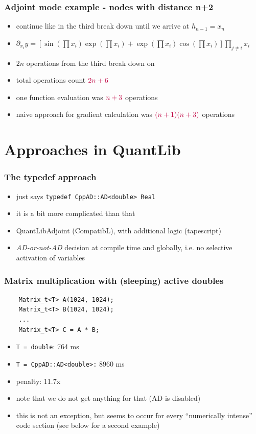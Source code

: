 \documentclass[10pt,German]{beamer}
\begin{document}
\begin{frame}[fragile]
\frametitle{Adjoint mode example - nodes with distance n+2}
\begin{itemize}
\item continue like in the third break down until we arrive at $h_{n-1} = x_n$
\item $\partial_{x_i} y = \left[\sin(\prod x_i)\exp(\prod x_i)+\exp(\prod x_i)\cos(\prod x_i)\right] \prod_{j\neq i} x_i$
\item $2n$ operations from the third break down on
\item total operations count $\textcolor{purple}{2n+6}$
\item one function evaluation was $\textcolor{purple}{n+3}$ operations
\item naive approach for gradient calculation was $\textcolor{purple}{(n+1)(n+3)}$ operations
\end{itemize}
\end{frame}

\section{Approaches in QuantLib}

\begin{frame}[fragile]
\frametitle{The typedef approach}
\begin{itemize}
\item just says \verb+typedef CppAD::AD<double> Real+
\item it is a bit more complicated than that
\item QuantLibAdjoint (CompatibL), with additional logic (tapescript)
\item \textit{AD-or-not-AD} decision at compile time and globally, i.e. no selective activation of variables
\end{itemize}
\end{frame}

\begin{frame}[fragile]
\frametitle{Matrix multiplication with (sleeping) active doubles}
\begin{verbatim}
    Matrix_t<T> A(1024, 1024);
    Matrix_t<T> B(1024, 1024);
    ...
    Matrix_t<T> C = A * B;
\end{verbatim}
\begin{itemize}
\item \verb+T = double+: 764 ms
\item \verb+T = CppAD::AD<double>:+ 8960 ms
\item penalty: 11.7x
\item note that we do not get anything for that (AD is disabled)
\item this is not an exception, but seems to occur for every ``numerically intense'' code section (see below for a second example)
\end{itemize}
\end{frame}
\end{document}

